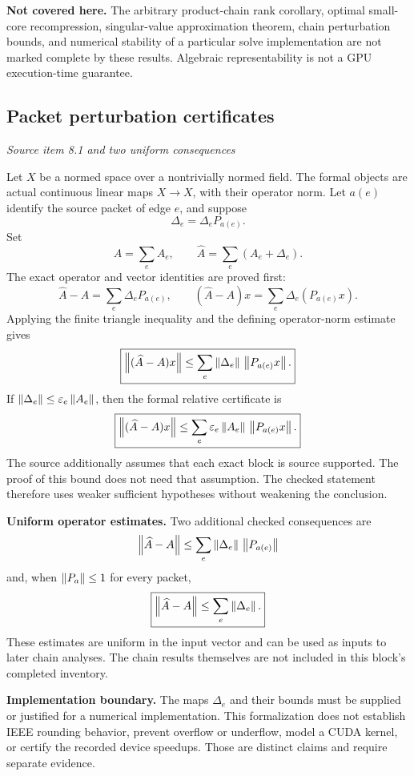 \textbf{Not covered here.} The arbitrary product-chain rank corollary, optimal small-core recompression, singular-value approximation theorem, chain perturbation bounds, and numerical stability of a particular solve implementation are not marked complete by these results. Algebraic representability is not a GPU execution-time guarantee.



\subsection{Packet perturbation certificates}\label{supp1:subsection:004}\textit{Source item 8.1 and two uniform consequences}\par
Let $X$ be a normed space over a nontrivially normed field. The formal objects are actual continuous linear maps $X\to X$, with their operator norm. Let $a(e)$ identify the source packet of edge $e$, and suppose
\[
\Delta_e=\Delta_e P_{a(e)}.
\]
Set
\[
A=\sum_e A_e,\qquad \widehat A=\sum_e(A_e+\Delta_e).
\]
The exact operator and vector identities are proved first:
\[
\widehat A-A=\sum_e\Delta_e P_{a(e)},\qquad
(\widehat A-A)x=\sum_e\Delta_e(P_{a(e)}x).
\]
Applying the finite triangle inequality and the defining operator-norm estimate gives
\[
\boxed{
\left\lVert(\widehat A-A)x\right\rVert
\le\sum_e\left\lVert\Delta_e\right\rVert\,\left\lVert P_{a(e)}x\right\rVert.
}
\]
If $\left\lVert\Delta_e\right\rVert\le\varepsilon_e\left\lVert A_e\right\rVert$, then the formal relative certificate is
\[
\boxed{
\left\lVert(\widehat A-A)x\right\rVert
\le\sum_e\varepsilon_e\left\lVert A_e\right\rVert\,\left\lVert P_{a(e)}x\right\rVert.
}
\]
The source additionally assumes that each exact block is source supported. The proof of this bound does not need that assumption. The checked statement therefore uses weaker sufficient hypotheses without weakening the conclusion.

\textbf{Uniform operator estimates.} Two additional checked consequences are
\[
\left\lVert\widehat A-A\right\rVert
\le\sum_e\left\lVert\Delta_e\right\rVert\,\left\lVert P_{a(e)}\right\rVert
\]
and, when $\left\lVert P_a\right\rVert\le1$ for every packet,
\[
\boxed{\left\lVert\widehat A-A\right\rVert\le\sum_e\left\lVert\Delta_e\right\rVert.}
\]
These estimates are uniform in the input vector and can be used as inputs to later chain analyses. The chain results themselves are not included in this block's completed inventory.

\textbf{Implementation boundary.} The maps $\Delta_e$ and their bounds must be supplied or justified for a numerical implementation. This formalization does not establish IEEE rounding behavior, prevent overflow or underflow, model a CUDA kernel, or certify the recorded device speedups. Those are distinct claims and require separate evidence.



